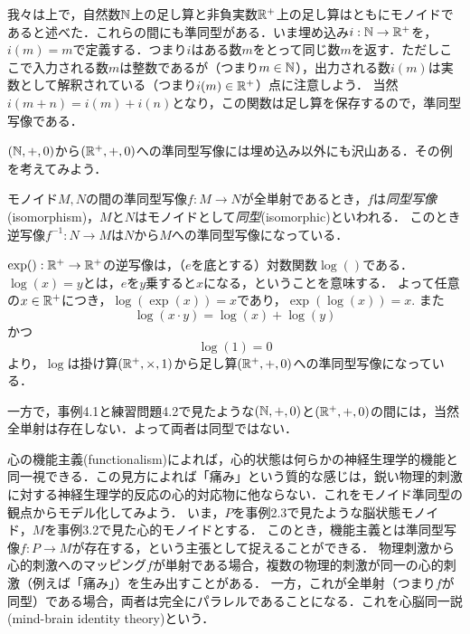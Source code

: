 \documentclass[11pt,a4paper]{jsarticle}
\begin{document}
\begin{example}
    我々は上で，自然数$\mathbb{N}$上の足し算と非負実数$\mathbb{R}^+$上の足し算はともにモノイドであると述べた．これらの間にも準同型がある．いま埋め込み$i:\mathbb{N} \to \mathbb{R}^+$を，$i(m)=m$で定義する．つまり$i$はある数$m$をとって同じ数$m$を返す．ただしここで入力される数$m$は整数であるが（つまり$m \in \mathbb{N}$），出力される数$i(m)$は実数として解釈されている（つまり$i(m) \in \mathbb{R}^+$）点に注意しよう．
    当然$i(m+n) = i(m)+i(n)$となり，この関数は足し算を保存するので，準同型写像である．
\end{example} 

\begin{exercise}
    $(\mathbb{N}, +, 0)$から$(\mathbb{R}^+, +, 0)$への準同型写像には埋め込み以外にも沢山ある．その例を考えてみよう．
\end{exercise}


\begin{dfn}[同型]
    モノイド$M, N$の間の準同型写像$f:M \to N$が全単射であるとき，$f$は\emph{同型写像}(isomorphism)，$M$と$N$はモノイドとして\emph{同型}(isomorphic)といわれる．
    このとき逆写像$f^{-1}:N \to M$は$N$から$M$への準同型写像になっている．
\end{dfn}

\begin{example}
    $\exp():\mathbb{R}^+ \to \mathbb{R}^+$の逆写像は，（$e$を底とする）対数関数$\log()$である．
    $\log(x)=y$とは，$e$を$y$乗すると$x$になる，ということを意味する．
    よって任意の$x\in\mathbb{R}^+$につき，$\log(\exp(x))=x$であり，$\exp(\log(x))=x$. また
    \[ \log(x \cdot y) = \log(x) + \log(y) \]
    かつ
    \[ \log(1) = 0 \]
    より，$\log$は掛け算$(\mathbb{R}^+, \times, 1)$から足し算$(\mathbb{R}^+, +, 0)$への準同型写像になっている．

    一方で，事例4.1と練習問題4.2で見たような$(\mathbb{N}, +, 0)$と$(\mathbb{R}^+, +, 0)$の間には，当然全単射は存在しない．よって両者は同型ではない．
\end{example}



\begin{example}
    心の機能主義(functionalism)によれば，心的状態は何らかの神経生理学的機能と同一視できる．この見方によれば「痛み」という質的な感じは，鋭い物理的刺激に対する神経生理学的反応の心的対応物に他ならない．これをモノイド準同型の観点からモデル化してみよう．
    いま，$P$を事例2.3で見たような脳状態モノイド，$M$を事例3.2で見た心的モノイドとする．
    このとき，機能主義とは準同型写像$f:P \to M$が存在する，という主張として捉えることができる．
    物理刺激から心的刺激へのマッピング$f$が単射である場合，複数の物理的刺激が同一の心的刺激（例えば「痛み」）を生み出すことがある．
    一方，これが全単射（つまり$f$が同型）である場合，両者は完全にパラレルであることになる．これを心脳同一説(mind-brain identity theory)という．
\end{example}
\end{document}

